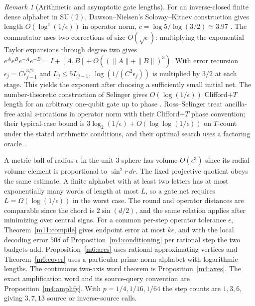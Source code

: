 \documentclass[11pt,reqno]{amsart}
\theoremstyle{definition}
\theoremstyle{remark}
\newtheorem{remark}[theorem]{Remark}
\numberwithin{equation}{section}
\begin{document}
\begin{remark}[Arithmetic and asymptotic gate lengths]\label{m11:compilers}
For an inverse-closed finite dense alphabet in $\mathrm{SU}(2)$,
Dawson--Nielsen's Solovay--Kitaev construction gives length
$O(\log^c(1/\epsilon))$ in operator norm,
$c=\log 5/\log(3/2)\simeq3.97$ \cite{d4-dawson}.
The commutator uses two corrections of size $O(\sqrt\epsilon)$:
multiplying the exponential Taylor expansions through degree
two gives $e^Ae^Be^{-A}e^{-B}=I+[A,B]+O((\|A\|+\|B\|)^3)$.
With error recursion $\epsilon_j=C\epsilon_{j-1}^{3/2}$ and
$L_j\le5L_{j-1}$, $\log(1/(C^2\epsilon_j))$ is multiplied by $3/2$
at each stage. This yields the exponent after choosing a sufficiently
small initial net. The number-theoretic construction of Selinger
gives $O(\log(1/\epsilon))$ Clifford$+T$ length for an arbitrary
one-qubit gate up to phase \cite{m11:Selinger}. Ross--Selinger
treat ancilla-free axial $z$-rotations in operator norm with their
Clifford$+T$ phase convention; their typical-case bound is
$3\log_2(1/\epsilon)+O(\log\log(1/\epsilon))$ on $T$-count under
the stated arithmetic conditions, and their optimal search uses a
factoring oracle \cite{m6:RS}.

A metric ball of radius $\epsilon$ in the unit $3$-sphere has
volume $O(\epsilon^3)$ since its radial volume element is proportional
to $\sin^2 r\,dr$. The fixed projective quotient obeys the same estimate.
A finite alphabet with at least two letters has at most exponentially
many words of length at most $L$, so a gate net requires
$L=\Omega(\log(1/\epsilon))$ in the worst case. The round and
operator distances are comparable since the chord is $2\sin(d/2)$,
and the same relation applies after minimizing over central signs.
For a common per-step operator tolerance $\epsilon$, Theorem~\ref{m11:compile}
gives endpoint error at most $k\epsilon$, and with the local decoding error
$50\delta$ of Proposition~\ref{m4:conditioning} per rational step the two
budgets add. Proposition~\ref{m6:arcs}
uses rational approximating vertices and Theorem~\ref{m6:cover}
uses a particular prime-norm alphabet with logarithmic lengths.
The continuous two-axis word theorem is Proposition~\ref{m4:axes}.
The exact amplification word and its source-query convention are
Proposition~\ref{m4:amplify}. With $p=1/4,1/16,1/64$ the step
counts are $1,3,6$, giving $3,7,13$ source or inverse-source calls.
\end{remark}
\end{document}
